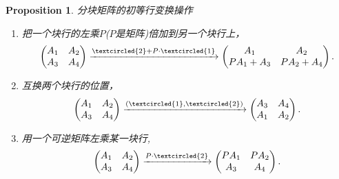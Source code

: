\documentclass{article}
\newtheorem{proposition}[theorem]{Proposition}
\begin{document}
\begin{proposition}
\rm 分块矩阵的初等行变换操作
\begin{enumerate}
	\item 把一个块行的{\color{red}左乘}$P$($P$是矩阵)倍加到另一个块行上，
	$$
	\begin{pmatrix}
	A_1 & A_2 \\
	A_3 & A_4
	\end{pmatrix}\xrightarrow{\tiny\textcircled{2} + P \cdot \tiny\textcircled{1}} 
	\begin{pmatrix}
	A_1 & A_2 \\
	PA_1+A_3 & PA_2 + A_4  
	\end{pmatrix}.
	$$
	\item 互换两个块行的位置，
	$$
	\begin{pmatrix}
	A_1 & A_2 \\
	A_3 & A_4
	\end{pmatrix}\xrightarrow{(\tiny\textcircled{1} ,  \tiny\textcircled{2})} 
	\begin{pmatrix}
	A_3 & A_4 \\
	A_1 & A_2   
	\end{pmatrix}.
	$$
	\item 用一个可逆矩阵{\color{red}左乘}某一块行,
	$$
	\begin{pmatrix}
	A_1 & A_2 \\
	A_3 & A_4
	\end{pmatrix}\xrightarrow{P\cdot \tiny\textcircled{2}} 
	\begin{pmatrix}
	PA_1 & PA_2 \\
	A_3 & A_4   
	\end{pmatrix}.
	$$
\end{enumerate}
\end{proposition}
\end{document}
